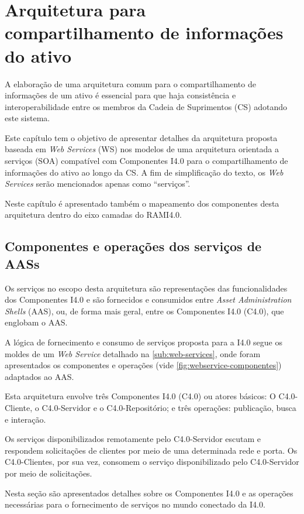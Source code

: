 \chapter{Arquitetura para compartilhamento de informações do ativo}
\label{cha:arquitetura}

A elaboração de uma arquitetura comum para o compartilhamento de informações de um ativo é essencial para que haja consistência e interoperabilidade entre os membros da Cadeia de Suprimentos (CS) adotando este sistema.

Este capítulo tem o objetivo de apresentar detalhes da arquitetura proposta baseada em \textit{Web Services} (WS) nos modelos de uma arquitetura orientada a serviços (SOA) compatível com Componentes I4.0 para o compartilhamento de informações do ativo ao longo da CS. A fim de simplificação do texto, os \textit{Web Services} serão mencionados apenas como ``serviços''.

Neste capítulo é apresentado também o mapeamento dos componentes desta arquitetura dentro do eixo camadas do RAMI4.0.

\section{Componentes e operações dos serviços de AASs}
\label{sec:componentes-e-operacoes}

Os serviços no escopo desta arquitetura são representações das funcionalidades dos Componentes I4.0 e são fornecidos e consumidos entre \textit{Asset Administration Shells} (AAS), ou, de forma mais geral, entre os Componentes I4.0 (C4.0), que englobam o AAS.

A lógica de fornecimento e consumo de serviços proposta para a I4.0 segue os moldes de um \textit{Web Service} detalhado na \autoref{sub:web-services}, onde foram apresentados os componentes e operações (vide \autoref{fig:webservice-componentes}) adaptados ao AAS.

Esta arquitetura envolve três Componentes I4.0 (C4.0) ou atores básicos: O C4.0-Cliente, o C4.0-Servidor e o C4.0-Repositório; e três operações: publicação, busca e interação.

Os serviços disponibilizados remotamente pelo C4.0-Servidor escutam e respondem solicitações de clientes por meio de uma determinada rede e porta. Os C4.0-Clientes, por sua vez, consomem o serviço disponibilizado pelo C4.0-Servidor por meio de solicitações.

Nesta seção são apresentados detalhes sobre os Componentes I4.0 e as operações necessárias para o fornecimento de serviços no mundo conectado da I4.0.

